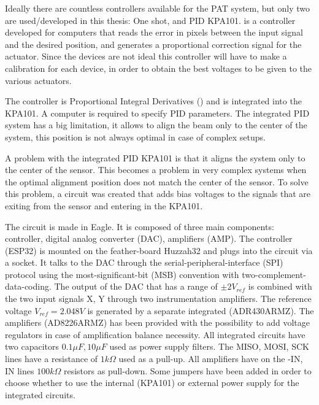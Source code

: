 Ideally there are countless controllers available for the PAT system, but only two are used/developed in this thesis: One shot, and PID KPA101.
 is a controller developed for computers that reads the error in pixels between the input signal and the desired position, and generates a proportional correction signal for the actuator.
Since the devices are not ideal this controller will have to make a calibration for each device, in order to obtain the best voltages to be given to the various actuators.

The  controller is Proportional Integral Derivatives () and is integrated into the KPA101. A computer is required to specify PID parameters. The integrated PID system has a big limitation, it allows to align the beam only to the center of the system, this position is not always optimal in case of complex setups.

A problem with the integrated PID KPA101 is that it aligns the system only to the center of the sensor. This becomes a problem in very complex systems when the optimal alignment position does not match the center of the sensor.
To solve this problem, a circuit was created that adds bias voltages to the signals that are exiting from the sensor and entering in the KPA101.

The circuit is made in Eagle. It is composed of three main components: controller, digital analog converter (DAC), amplifiers (AMP).
The controller (ESP32) is mounted on the feather-board Huzzah32 and plugs into the circuit via a socket. It talks to the DAC through the serial-peripheral-interface (SPI) protocol using the most-significant-bit (MSB) convention with two-complement-data-coding.
The output of the DAC that has a range of $\pm 2 V_{ref}$ is combined with the two input signals X, Y through two instrumentation amplifiers. The reference voltage $V_{ref} = 2.048V$ is generated by a separate integrated (ADR430ARMZ).
The amplifiers (AD8226ARMZ) has been provided with the possibility to add voltage regulators in case of amplification balance necessity.
All integrated circuits have two capacitors $0.1 \mu F, 10 \mu F$ used as power supply filters. The MISO, MOSI, SCK lines have a resistance of $1 k \Omega$ used as a pull-up.
All amplifiers have on the -IN, IN lines $100 k \Omega$ resistors as pull-down. Some jumpers have been added in order to choose whether to use the internal (KPA101) or external power supply for the integrated circuits.

